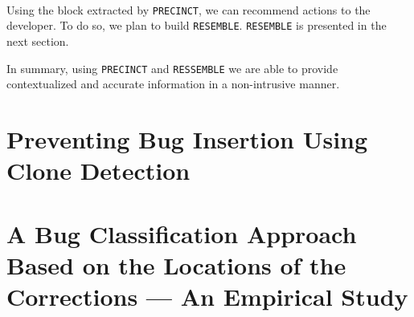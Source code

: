 

\\
Using the block extracted by {\tt PRECINCT}, we can recommend actions to the developer.
To do so, we plan to build {\tt RESEMBLE}.
{\tt RESEMBLE} is presented in the next section.




In summary, using {\tt PRECINCT} and {\tt RESSEMBLE} we are able to provide contextualized and accurate information in a non-intrusive manner.

\chapter{Preventing Bug Insertion Using Clone Detection\label{chap:bianca}}



\chapter{A Bug Classification Approach Based on the Locations of the Corrections --- An Empirical Study\label{chap:taxonomy}}


